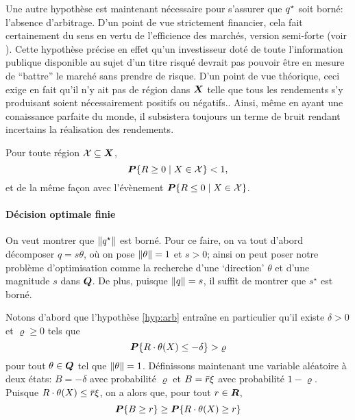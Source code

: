 Une autre hypothèse est maintenant nécessaire pour s'assurer que $q^\star$ soit borné:
l'absence d'arbitrage. D'un point de vue strictement financier, cela fait certainement du
sens en vertu de l'efficience des marchés, version semi-forte (voir
\cite{fama1970efficient}). Cette hypothèse précise en effet qu'un investisseur doté de
toute l'information publique disponible au sujet d'un titre risqué devrait pas pouvoir
être en mesure de ``battre'' le marché sans prendre de risque. D'un point de vue
théorique, ceci exige en fait qu'il n'y ait pas de région dans $\bm{X}$ telle que tous les
rendements s'y produisant soient nécessairement positifs ou négatifs.. Ainsi, même en ayant une conaissance parfaite du monde, il subsistera toujours
un terme de bruit rendant incertains la réalisation des rendements.

\begin{assumption}
  \label{hyp:arb}
  Pour toute région $\mathcal{X}\subseteq\bm{X}$,
  \begin{equation}
    \bm P\{R \geq 0 \mid X \in \mathcal{X}\} < 1,
  \end{equation}
  et de la même façon avec l'évènement $\bm P\{R \leq 0 \mid X \in \mathcal{X}\}$. 
\end{assumption}


\paragraph{Décision optimale finie}

On veut montrer que $\|q^\star\|$ est borné. Pour ce faire, on va tout d'abord décomposer
$q = s\theta$, où on pose $\|\theta\|=1$ et $s>0$; ainsi on peut poser notre problème
d'optimisation comme la recherche d'une `direction' $\theta$ et d'une magnitude $s$ dans
$\bm Q$. De plus, puisque $\|q\| = s$, il suffit de montrer que $s^\star$ est borné.

Notons d'abord que l'hypothèse \ref{hyp:arb} entraîne en particulier qu'il existe
$\delta > 0$ et $\varrho \geq 0$ tels que
\begin{equation}
  \bm P\{R\cdot \theta(X) \leq -\delta\} > \varrho
\end{equation}
pour tout $\theta \in \bm Q$ tel que $\|\theta\| = 1$. Définissons maintenant une variable aléatoire à
deux états: $B = -\delta$ avec probabilité $\varrho$ et $B = \bar r\xi$ avec probabilité
$1-\varrho$. Puisque $R\cdot \theta(X) \leq \bar r\xi$, on a alors que, pour tout $r \in \bm{R}$,
\begin{equation}
  \bm P\{B\geq r\} \geq \bm P\{R\cdot \theta(X)\geq r\}
\end{equation}

